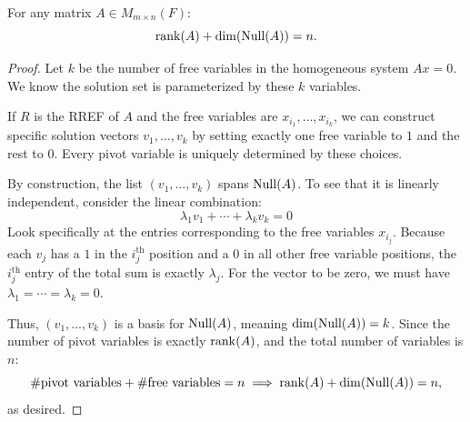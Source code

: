 \documentclass[../linear_algebra_and_groups.tex]{subfiles}
\begin{document}
\begin{theorem}
    \begin{shaded*}
        For any matrix $A\in M_{m\times n}(F)$:
        \[ \operatorname{rank}(A) + \dim(\operatorname{Null}(A)) = n. \]
    \end{shaded*}
\end{theorem}
\begin{proof}
    Let $k$ be the number of free variables in the homogeneous system $Ax=0$. We know the solution set is parameterized by these $k$ variables. 
    
    If $R$ is the RREF of $A$ and the free variables are $x_{i_1},\dots,x_{i_k}$, we can construct specific solution vectors $v_1,\dots,v_k$ by setting exactly one free variable to $1$ and the rest to $0$. Every pivot variable is uniquely determined by these choices. 
    
    By construction, the list $(v_1, \dots, v_k)$ spans $\operatorname{Null}(A)$. To see that it is linearly independent, consider the linear combination:
    \[ \lambda_1v_1+\cdots+\lambda_kv_k = 0 \]
    Look specifically at the entries corresponding to the free variables $x_{i_j}$. Because each $v_j$ has a $1$ in the $i_j^{\mathrm{th}}$ position and a $0$ in all other free variable positions, the $i_j^{\mathrm{th}}$ entry of the total sum is exactly $\lambda_j$. For the vector to be zero, we must have $\lambda_1 = \cdots = \lambda_k = 0$. 
    
    Thus, $(v_1, \dots, v_k)$ is a basis for $\operatorname{Null}(A)$, meaning $\dim(\operatorname{Null}(A)) = k$. Since the number of pivot variables is exactly $\operatorname{rank}(A)$, and the total number of variables is $n$:
    \[ \#\text{pivot variables} + \#\text{free variables} = n \implies \operatorname{rank}(A) + \dim(\operatorname{Null}(A)) = n,\]
    as desired.\qedhere
\end{proof}
\end{document}

